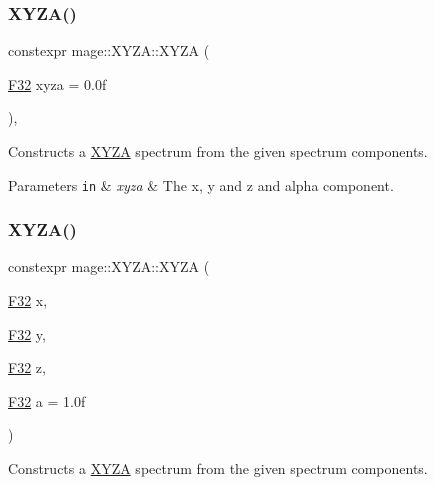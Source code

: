 \subsubsection{\texorpdfstring{X\+Y\+Z\+A()}{XYZA()}\hspace{0.1cm}{\footnotesize\ttfamily [1/7]}}
{\footnotesize\ttfamily constexpr mage\+::\+X\+Y\+Z\+A\+::\+X\+Y\+ZA (\begin{DoxyParamCaption}\item[{\mbox{\hyperlink{namespacemage_aa97e833b45f06d60a0a9c4fc22ae02c0}{F32}}}]{xyza = {\ttfamily 0.0f} }\end{DoxyParamCaption})\hspace{0.3cm}{\ttfamily [explicit]}, {\ttfamily [noexcept]}}

Constructs a \mbox{\hyperlink{structmage_1_1_x_y_z_a}{X\+Y\+ZA}} spectrum from the given spectrum components.


\begin{DoxyParams}[1]{Parameters}
\mbox{\tt in}  & {\em xyza} & The x, y and z and alpha component. \\
\hline
\end{DoxyParams}
\mbox{\label{structmage_1_1_x_y_z_a_abe082fe71a6b7f7a855b65f5491e24d6}} 
\subsubsection{\texorpdfstring{X\+Y\+Z\+A()}{XYZA()}\hspace{0.1cm}{\footnotesize\ttfamily [2/7]}}
{\footnotesize\ttfamily constexpr mage\+::\+X\+Y\+Z\+A\+::\+X\+Y\+ZA (\begin{DoxyParamCaption}\item[{\mbox{\hyperlink{namespacemage_aa97e833b45f06d60a0a9c4fc22ae02c0}{F32}}}]{x,  }\item[{\mbox{\hyperlink{namespacemage_aa97e833b45f06d60a0a9c4fc22ae02c0}{F32}}}]{y,  }\item[{\mbox{\hyperlink{namespacemage_aa97e833b45f06d60a0a9c4fc22ae02c0}{F32}}}]{z,  }\item[{\mbox{\hyperlink{namespacemage_aa97e833b45f06d60a0a9c4fc22ae02c0}{F32}}}]{a = {\ttfamily 1.0f} }\end{DoxyParamCaption})\hspace{0.3cm}{\ttfamily [noexcept]}}

Constructs a \mbox{\hyperlink{structmage_1_1_x_y_z_a}{X\+Y\+ZA}} spectrum from the given spectrum components.


